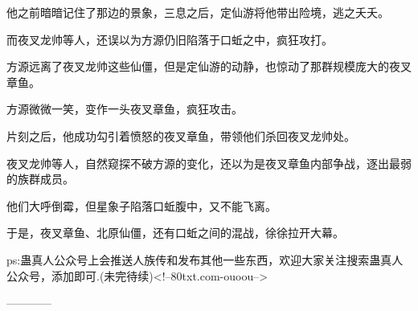 \begin{this_body}
他之前暗暗记住了那边的景象，三息之后，定仙游将他带出险境，逃之夭夭。

而夜叉龙帅等人，还误以为方源仍旧陷落于口蚯之中，疯狂攻打。

方源远离了夜叉龙帅这些仙僵，但是定仙游的动静，也惊动了那群规模庞大的夜叉章鱼。

方源微微一笑，变作一头夜叉章鱼，疯狂攻击。

片刻之后，他成功勾引着愤怒的夜叉章鱼，带领他们杀回夜叉龙帅处。

夜叉龙帅等人，自然窥探不破方源的变化，还以为是夜叉章鱼内部争战，逐出最弱的族群成员。

他们大呼倒霉，但星象子陷落口蚯腹中，又不能飞离。

于是，夜叉章鱼、北原仙僵，还有口蚯之间的混战，徐徐拉开大幕。

ps:蛊真人公众号上会推送人族传和发布其他一些东西，欢迎大家关注搜索蛊真人公众号，添加即可.(未完待续)<!--80txt.com-ouoou-->

------------

\end{this_body}

